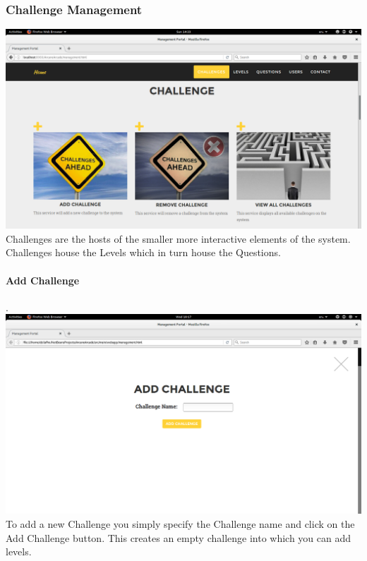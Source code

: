 \documentclass[english]{article}
\begin{document}
				
				
				
					
			
			
			
			\newpage	
			\subsubsection{Challenge Management}
				\includegraphics[width=\linewidth]{Challenge.png}				\newline
					Challenges are the hosts of the smaller more interactive elements of the system. Challenges house the Levels which in turn house the Questions.				\\[12pt]\newline

				\paragraph{Add Challenge}. \\ \newline
				\includegraphics[width=\linewidth]{AddChallenge.png}				\newline
To add a new Challenge you simply specify the Challenge name and click on the Add Challenge button. This creates an  empty challenge into which you can add levels.
				\\[12pt]\newline
\end{document}

